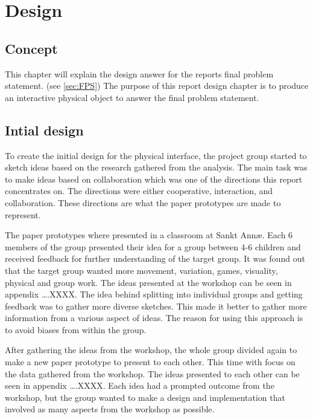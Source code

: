 \chapter{Design}

\section{Concept}
This chapter will explain the design answer for the reports final problem statement. (see \autoref{sec:FPS}) The purpose of this report design chapter is to produce an interactive physical object to answer the final problem statement. 

\section{Intial design}
\setlength{\parskip}{1em}

\setlength{\parindent}{10ex}
To create the initial design for the physical interface, the project group started to sketch ideas based on the research gathered from the analysis. The main task was to make ideas based on collaboration which was one of the directions this report concentrates on. The directions were either cooperative, interaction, and collaboration. These directions are what the paper prototypes are made to represent.\par

\setlength{\parindent}{10ex}
The paper prototypes where presented in a classroom at Sankt Annæ. Each 6 members of the group presented their idea for a group between 4-6 children and received feedback for further understanding of the target group. It was found out that the target group wanted more movement, variation, games, visuality, physical and group work. 
The ideas presented at the workshop can be seen in appendix ….XXXX.
The idea behind splitting into individual groups and getting feedback was to gather more diverse sketches. This made it better to gather more information from a various aspect of ideas. The reason for using this approach is to avoid biases from within the group. \par

\setlength{\parindent}{10ex}
After gathering the ideas from the workshop, the whole group divided again to make a new paper prototype to present to each other. This time with focus on the data gathered from the workshop. 
The ideas presented to each other can be seen in appendix ….XXXX. 
Each idea had a prompted outcome from the workshop, but the group wanted to make a design and implementation that involved as many aspects from the workshop as possible. \par

